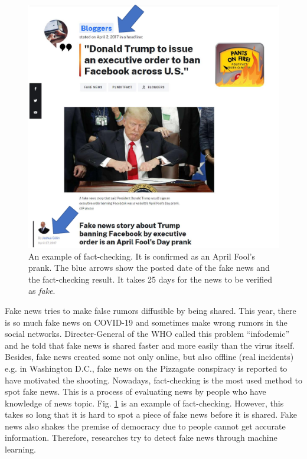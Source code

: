 \documentclass[conference]{IEEEtran}
\begin{document}
\begin{figure}[!t]
    \centering
    \includegraphics[width=\linewidth]{fact-check.pdf}
    \caption{
        An example of fact-checking. It is confirmed as an April Fool's prank.
        The blue arrows show the posted date of the fake news and the fact-checking result.
        It takes 25 days for the news to be verified as \textit{fake}.
        }
    \label{fig:example}
\end{figure}


Fake news tries to make false rumors diffusible by being shared.
This year, there is so much fake news on COVID-19 and sometimes make wrong rumors in the social networks.
Directer-General of the WHO called this problem ``infodemic'' and he told that fake news is shared faster and more easily than the virus itself\cite{ZAROCOSTAS2020676}. 
Besides, fake news created some not only online, but also offline (real incidents)
e.g. in Washington D.C., fake news on the Pizzagate conspiracy is reported to have motivated the shooting\cite{agencies_2016}.
Nowadays, fact-checking is the most used method to spot fake news.
This is a process of evaluating news by people who have knowledge of news topic.
Fig. \ref{fig:example} is an example of fact-checking\cite{gillin_2017}.
However, this takes so long that it is hard to spot a piece of fake news before it is shared.
Fake news also shakes the premise of democracy due to people cannot get accurate information.
Therefore, researches try to detect fake news through machine learning.
\end{document}
